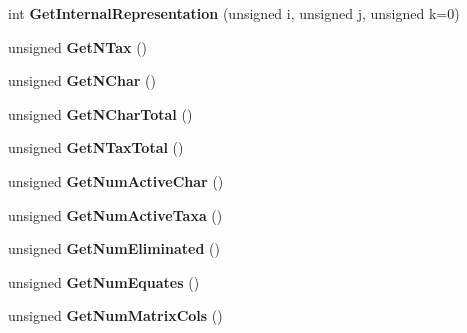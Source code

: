\begin{DoxyCompactItemize}
\item 
\hypertarget{classNxsCharactersBlock_a681a9a39ad83766172e793139625029d}{
int {\bfseries GetInternalRepresentation} (unsigned i, unsigned j, unsigned k=0)}
\label{classNxsCharactersBlock_a681a9a39ad83766172e793139625029d}

\item 
\hypertarget{classNxsCharactersBlock_af86976f48a20f5070614d5bba79f5dd8}{
unsigned {\bfseries GetNTax} ()}
\label{classNxsCharactersBlock_af86976f48a20f5070614d5bba79f5dd8}

\item 
\hypertarget{classNxsCharactersBlock_a31fd31b367f9ea2ba68befafd375d098}{
unsigned {\bfseries GetNChar} ()}
\label{classNxsCharactersBlock_a31fd31b367f9ea2ba68befafd375d098}

\item 
\hypertarget{classNxsCharactersBlock_a68ae4020e94ccc851518bf1b75fee6db}{
unsigned {\bfseries GetNCharTotal} ()}
\label{classNxsCharactersBlock_a68ae4020e94ccc851518bf1b75fee6db}

\item 
\hypertarget{classNxsCharactersBlock_a201539150be60777b242bd51950970a9}{
unsigned {\bfseries GetNTaxTotal} ()}
\label{classNxsCharactersBlock_a201539150be60777b242bd51950970a9}

\item 
\hypertarget{classNxsCharactersBlock_a937d67e5d8dbacfb254ab558c7fe40fc}{
unsigned {\bfseries GetNumActiveChar} ()}
\label{classNxsCharactersBlock_a937d67e5d8dbacfb254ab558c7fe40fc}

\item 
\hypertarget{classNxsCharactersBlock_adcaf9c88dae34c0dc55a34d7c5c87bd7}{
unsigned {\bfseries GetNumActiveTaxa} ()}
\label{classNxsCharactersBlock_adcaf9c88dae34c0dc55a34d7c5c87bd7}

\item 
\hypertarget{classNxsCharactersBlock_a2487dd4245fe27bdd2875b28e220cb53}{
unsigned {\bfseries GetNumEliminated} ()}
\label{classNxsCharactersBlock_a2487dd4245fe27bdd2875b28e220cb53}

\item 
\hypertarget{classNxsCharactersBlock_a82168b018dec9309602c792d2186d2b9}{
unsigned {\bfseries GetNumEquates} ()}
\label{classNxsCharactersBlock_a82168b018dec9309602c792d2186d2b9}

\item 
\hypertarget{classNxsCharactersBlock_ad61b58c4ba502c3575e6e14dcfe07a77}{
unsigned {\bfseries GetNumMatrixCols} ()}
\label{classNxsCharactersBlock_ad61b58c4ba502c3575e6e14dcfe07a77}


\end{DoxyCompactItemize}
